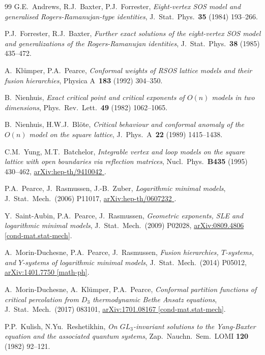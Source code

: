 \documentclass[11pt]{article}
\numberwithin{equation}{section}
\theoremstyle{plain}
\numberwithin{equation}{section}
\def\arxiv#1#2{\href{http://arxiv.org/abs/#1}{\textsf{arXiv:#1 #2}}}
\begin{document}
\begin{thebibliography}{99}
G.E.~Andrews, R.J.~Baxter, P.J.~Forrester,
{\em Eight-vertex SOS model and generalised Rogers-Ramanujan-type identities},
J.~Stat.~Phys.~{\bf 35} (1984) 193--266.

P.J.~Forrester, R.J.~Baxter,
{\em Further exact solutions of the eight-vertex SOS model and generalizations of the Rogers-Ramanujan identities},
J.~Stat.~Phys.~{\bf 38} (1985) 435--472.

A.~Kl\"umper, P.A.~Pearce, 
{\em Conformal weights of RSOS lattice models and their fusion hierarchies}, 
Physica A~{\bf 183} (1992) 304--350.	

B.~Nienhuis, 
{\em Exact critical point and critical exponents of $O(n)$ models in two dimensions},
Phys.~Rev.~Lett.~{\bf 49} (1982) 1062--1065.
	
B.~Nienhuis, H.W.J.~Bl\"ote,
{\em Critical behaviour and conformal anomaly of the $O(n)$ model on the square lattice},
J.~Phys.~A~{\bf 22} (1989) 1415--1438.
	
C.M.~Yung, M.T.~Batchelor,
{\em Integrable vertex and loop models on the square lattice with open boundaries via reflection matrices},
Nucl.~Phys.~{\bf B435} (1995) 430--462,
\arxiv{hep-th/9410042}{\!\!}.
	
P.A.~Pearce, J.~Rasmussen, J.-B.~Zuber,
{\em Logarithmic minimal models}, 
 J.~Stat.~Mech.~(2006) P11017, \arxiv{hep-th/0607232}{\!\!}.
 
Y.~Saint-Aubin, P.A.~Pearce, J.~Rasmussen,
{\em Geometric exponents, SLE and logarithmic minimal models}, 
J.~Stat.~Mech.~(2009) P02028, \arxiv{0809.4806}{[cond-mat.stat-mech]}.

	A.~Morin-Duchesne, P.A.~Pearce, J.~Rasmussen,
	{\em Fusion hierarchies, $T$-systems, and $Y$-systems of logarithmic minimal models}, 
	J.~Stat.~Mech.~(2014) P05012,
	\arxiv{1401.7750}{[math-ph]}.

	A.~Morin-Duchesne, A.~Kl\"umper, P.A.~Pearce, 
	{\em Conformal partition functions of critical percolation from $D_3$ thermodynamic Bethe Ansatz equations}, 
	J.~Stat.~Mech.~(2017) 083101,
	\arxiv{1701.08167}{[cond-mat.stat-mech]}.

P.P.~Kulish, N.Yu.~Reshetikhin, 
{\em On $GL_3$-invariant solutions to the Yang-Baxter equation and the associated quantum systems},
Zap.~Nauchn.~Sem.~LOMI {\bf 120} (1982) 92--121.
	

\end{thebibliography}
\end{document}
